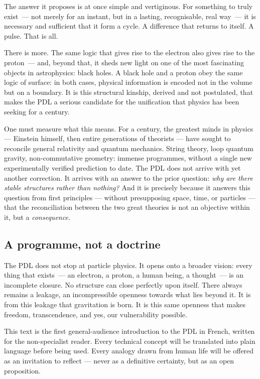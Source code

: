 \documentclass[12pt, a4paper, openright]{book}
\begin{document}
The answer it proposes is at once simple and vertiginous. For something to truly exist~--- not merely for an instant, but in a lasting, recognisable, real way~--- it is necessary and sufficient that it form a cycle. A difference that returns to itself. A pulse. That is all.

\medskip

There is more. The same logic that gives rise to the electron also gives rise to the proton~--- and, beyond that, it sheds new light on one of the most fascinating objects in astrophysics: black holes. A black hole and a proton obey the same logic of surface: in both cases, physical information is encoded not in the volume but on a boundary. It is this structural kinship, derived and not postulated, that makes the PDL a serious candidate for the unification that physics has been seeking for a century. 

\medskip

One must measure what this means. For a century, the greatest minds in physics --- Einstein himself, then entire generations of theorists --- have sought to reconcile general relativity and quantum mechanics. String theory, loop quantum gravity, non-commutative geometry: immense programmes, without a single new experimentally verified prediction to date. The PDL does not arrive with yet another correction. It arrives with an answer to the prior question: \emph{why are there stable structures rather than nothing?} And it is precisely because it answers this question from first principles --- without presupposing space, time, or particles --- that the reconciliation between the two great theories is not an objective within it, but a \emph{consequence}.

\subsection*{A programme, not a doctrine}

The PDL does not stop at particle physics. It opens onto a broader vision: every thing that exists~--- an electron, a proton, a human being, a thought~--- is an incomplete closure. No structure can close perfectly upon itself. There always remains a leakage, an incompressible openness towards what lies beyond it. It is from this leakage that gravitation is born. It is this same openness that makes freedom, transcendence, and yes, our vulnerability possible.

\medskip

This text is the first general-audience introduction to the PDL in French, written for the non-specialist reader. Every technical concept will be translated into plain language before being used. Every analogy drawn from human life will be offered as an invitation to reflect — never as a definitive certainty, but as an open proposition.
\end{document}
